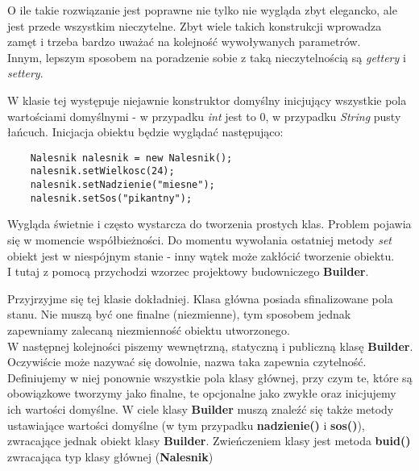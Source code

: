 \documentclass[12pt,a4paper]{article}
\begin{document}
    

    O ile takie rozwiązanie jest poprawne nie tylko nie wygląda zbyt elegancko, ale jest przede wszystkim nieczytelne. Zbyt wiele takich konstrukcji wprowadza zamęt i trzeba bardzo uważać na kolejność wywoływanych parametrów.\\
    Innym, lepszym sposobem na poradzenie sobie z taką nieczytelnością są \textit{gettery} i \textit{settery}.
    
    
    
    W klasie tej występuje niejawnie konstruktor domyślny inicjujący wszystkie pola wartościami domyślnymi - w przypadku \textit{int} jest to 0, w przypadku \textit{String} pusty łańcuch. Inicjacja obiektu będzie wyglądać następująco:
    \begin{lstlisting}
    Nalesnik nalesnik = new Nalesnik();
    nalesnik.setWielkosc(24);
    nalesnik.setNadzienie("miesne");
    nalesnik.setSos("pikantny");
    \end{lstlisting}
    Wygląda świetnie i często wystarcza do tworzenia prostych klas. Problem pojawia się w momencie współbieżności. Do momentu wywołania ostatniej metody \textit{set} obiekt jest w niespójnym stanie - inny wątek może zakłócić tworzenie obiektu.\\
    I tutaj z pomocą przychodzi wzorzec projektowy budowniczego \textbf{Builder}.
    
    Przyjrzyjme się tej klasie dokładniej. Klasa główna posiada sfinalizowane pola stanu. Nie muszą być one finalne (niezmienne), tym sposobem jednak zapewniamy  zalecaną niezmienność obiektu utworzonego.\\
    W następnej kolejności piszemy wewnętrzną, statyczną i publiczną klasę \textbf{Builder}. Oczywiście może nazywać się dowolnie, nazwa taka zapewnia czytelność. Definiujemy w niej ponownie wszystkie pola klasy głównej, przy czym te, które są obowiązkowe tworzymy jako finalne, te opcjonalne jako zwykłe oraz inicjujemy ich wartości domyślne. W ciele klasy \textbf{Builder} muszą znaleźć się także metody ustawiające wartości domyślne (w tym przypadku \textbf{nadzienie()} i \textbf{sos()}), zwracające jednak obiekt klasy \textbf{Builder}. Zwieńczeniem klasy jest metoda \textbf{buid()} zwracająca typ klasy głównej (\textbf{Nalesnik})
\end{document}

